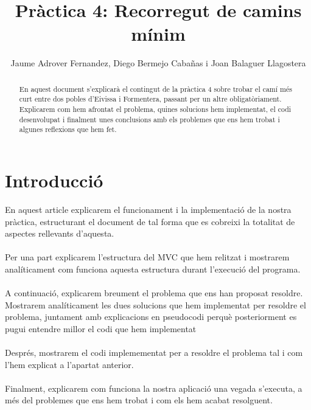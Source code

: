 \documentclass[conference]{IEEEtran}
\title{Pràctica 4: Recorregut de camins mínim}
\author{Jaume Adrover Fernandez, Diego Bermejo Cabañas i Joan Balaguer Llagostera}
\begin{document}
\maketitle

\begin{abstract}
    En aquest document s'explicarà el contingut de la pràctica 4 sobre trobar el camí més curt entre dos pobles d'Eivissa i Formentera, passant per un altre obligatòriament. Explicarem com hem afrontat el problema, quines solucions hem implementat,  el codi desenvolupat i finalment unes conclusions amb els problemes que ens hem trobat i algunes reflexions que hem fet.
\end{abstract}

\section{Introducció}
En aquest article explicarem el funcionament i la implementació de la nostra pràctica, estructurant el document de tal forma que es cobreixi la totalitat de aspectes rellevants d'aquesta.\\\\
Per una part explicarem l'estructura del MVC que hem relitzat i mostrarem analíticament com funciona aquesta estructura durant l'execució del programa.\\\\
A continuació, explicarem breument el problema que ens han proposat resoldre. Mostrarem analíticament les dues solucions que hem implementat per resoldre el problema, juntament amb explicacions en pseudocodi perquè posteriorment es pugui entendre millor el codi que hem implementat\\\\
Després, mostrarem el codi implemementat per a resoldre el problema tal i com l'hem explicat a l'apartat anterior.\\\\
Finalment, explicarem com funciona la nostra aplicació una vegada s'executa, a més del problemes que ens hem trobat i com els hem acabat resolguent.\\
\end{document}
